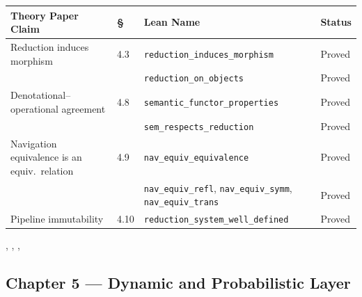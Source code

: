 \begin{center}
\begin{tabular}{p{5.2cm}lp{5.2cm}l}
\toprule
Theory Paper Claim & \S & Lean Name & Status \\
\midrule
Reduction induces morphism
  & 4.3 & \texttt{reduction\_induces\_morphism}         & Proved \\
  &     & \texttt{reduction\_on\_objects}               & Proved \\
Denotational--operational agreement
  & 4.8 & \texttt{semantic\_functor\_properties}        & Proved \\
  &     & \texttt{sem\_respects\_reduction}             & Proved \\
Navigation equivalence is an equiv.\ relation
  & 4.9 & \texttt{nav\_equiv\_equivalence}              & Proved \\
  &     & \texttt{nav\_equiv\_refl}, \texttt{nav\_equiv\_symm}, \texttt{nav\_equiv\_trans} & Proved \\
Pipeline immutability
  & 4.10 & \texttt{reduction\_system\_well\_defined}    & Proved \\
\bottomrule
\end{tabular}
\end{center}

\noindent{}, ,
, 

\subsection*{Chapter 5 — Dynamic and Probabilistic Layer}


